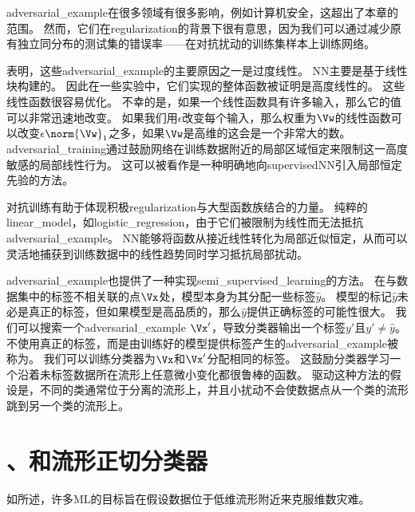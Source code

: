 
\gls{adversarial_example}在很多领域有很多影响，例如计算机安全，这超出了本章的范围。
然而，它们在\gls{regularization}的背景下很有意思，因为我们可以通过减少原有独立同分布的测试集的错误率——在对抗扰动的训练集样本上训练网络\citep{Szegedy-et-al-2014b,Goodfellow-et-al-2014b}。


\cite{Goodfellow-et-al-2014b}表明，这些\gls{adversarial_example}的主要原因之一是过度线性。
\gls{NN}主要是基于线性块构建的。
因此在一些实验中，它们实现的整体函数被证明是高度线性的。
这些线性函数很容易优化。
不幸的是，如果一个线性函数具有许多输入，那么它的值可以非常迅速地改变。
如果我们用$\epsilon$改变每个输入，那么权重为$\Vw$的线性函数可以改变$\epsilon \norm{\Vw}_1$之多，如果$\Vw$是高维的这会是一个非常大的数。
\gls{adversarial_training}通过鼓励网络在训练数据附近的局部区域恒定来限制这一高度敏感的局部线性行为。
这可以被看作是一种明确地向\gls{supervised}\gls{NN}引入局部恒定先验的方法。

对抗训练有助于体现积极\gls{regularization}与大型函数族结合的力量。
纯粹的\gls{linear_model}，如\gls{logistic_regression}，由于它们被限制为线性而无法抵抗\gls{adversarial_example}。
\gls{NN}能够将函数从接近线性转化为局部近似恒定，从而可以灵活地捕获到训练数据中的线性趋势同时学习抵抗局部扰动。

\gls{adversarial_example}也提供了一种实现\gls{semi_supervised_learning}的方法。
在与数据集中的标签不相关联的点$\Vx$处，模型本身为其分配一些标签$\hat y$。
模型的标记$\hat y$未必是真正的标签，但如果模型是高品质的，那么$\hat y$提供正确标签的可能性很大。
我们可以搜索一个\gls{adversarial_example} $\Vx'$，导致分类器输出一个标签$y'$且$y' \neq \hat y$。
不使用真正的标签，而是由训练好的模型提供标签产生的\gls{adversarial_example}被称为\citep{Miyato-et-al-2015}。
我们可以训练分类器为$\Vx$和$\Vx'$分配相同的标签。
这鼓励分类器学习一个沿着未标签数据所在流形上任意微小变化都很鲁棒的函数。
驱动这种方法的假设是，不同的类通常位于分离的流形上，并且小扰动不会使数据点从一个类的流形跳到另一个类的流形上。


\section{、和流形正切分类器}
\label{sec:tangent_distance_tangent_prop_and_manifold_tangent_classifier}
如所述，许多\gls{ML}的目标旨在假设数据位于低维流形附近来克服维数灾难。

